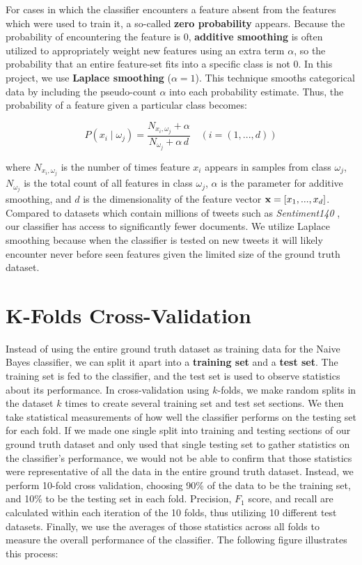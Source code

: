 \documentclass[11pt, twoside, reqno]{book}
\begin{document}
For cases in which the classifier encounters a feature absent from the features which were used to train it, a so-called \textbf{zero probability} appears. Because the probability of encountering the feature is 0, \textbf{additive smoothing} is often utilized to appropriately weight new features using an extra term $\alpha$, so the probability that an entire feature-set fits into a specific class is not 0. In this project, we use \textbf{Laplace smoothing} ($\alpha=1$). This technique smooths categorical data by including the pseudo-count $\alpha$ into each probability estimate. Thus, the probability of a feature given a particular class becomes:

\[P(x_i \mid \omega_j) = \frac{N_{x_i, \omega_j}+\alpha}{N_{\omega_j} + \alpha \, d}  \quad (i = (1, ... , d))\]

\noindent 
where $N_{x_i, \omega_j}$ is the number of times feature $x_i$ appears in samples from class $\omega_j$, $N_{\omega_j}$ is the total count of all features in class $\omega_j$, $\alpha$ is the parameter for additive smoothing, and $d$ is the dimensionality of the feature vector $\textbf x = [x_1, ..., x_d]$. Compared to datasets which contain millions of tweets such as \textit{Sentiment140} \cite{go_dataset}, our classifier has access to significantly fewer documents. We utilize Laplace smoothing because when the classifier is tested on new tweets it will likely encounter never before seen features given the limited size of the ground truth dataset.

\section{K-Folds Cross-Validation}
\label{cross_validation}

Instead of using the entire ground truth dataset as training data for the Naive Bayes classifier, we can split it apart into a \textbf{training set} and a \textbf{test set}. The training set is fed to the classifier, and the test set is used to observe statistics about its performance. In cross-validation using $k$-folds, we make random splits in the dataset $k$ times to create several training set and test set sections. We then take statistical measurements of how well the classifier performs on the testing set for each fold. If we made one single split into training and testing sections of our ground truth dataset and only used that single testing set to gather statistics on the classifier's performance, we would not be able to confirm that those statistics were representative of all the data in the entire ground truth dataset. Instead, we perform 10-fold cross validation, choosing 90\% of the data to be the training set, and 10\% to be the testing set in each fold. Precision, $F_{1}$ score, and recall are calculated within each iteration of the 10 folds, thus utilizing 10 different test datasets. Finally, we use the averages of those statistics across all folds to measure the overall performance of the classifier. The following figure illustrates this process:
\end{document}
